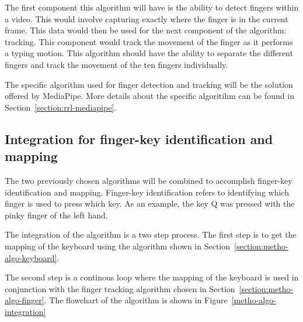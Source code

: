 \documentclass{report}
\begin{document}
The first component this algorithm will have is the ability to detect fingers
within a video. This would involve capturing exactly where the finger is in the
current frame. This data would then be used for the next component of the
algorithm: tracking. This component would track the movement of the finger as it
performs a typing motion. This algorithm should have the ability to separate the
different fingers and track the movement of the ten fingers individually.

The specific algorithm used for finger detection and tracking will be the
solution offered by MediaPipe. More details about the specific algoritihm can be
found in Section~\ref{section:rrl-mediapipe}.

\subsection{Integration for finger-key identification and mapping}

The two previously chosen algorithms will be combined to accomplish finger-key
identification and mapping. Finger-key identification refers to identifying
which finger is used to press which key. As an example, the key Q was pressed
with the pinky finger of the left hand.

The integration of the algorithm is a two step process. The first step is to get
the mapping of the keyboard using the algorithm shown in Section~\ref{section:metho-algo-keyboard}.

The second step is a continous loop where the mapping of the keyboard is used in
conjunction with the finger tracking algorithm chosen in
Section~\ref{section:metho-algo-finger}. The flowchart of the algorithm is shown
in Figure~\ref{metho-algo-integration}
\end{document}
